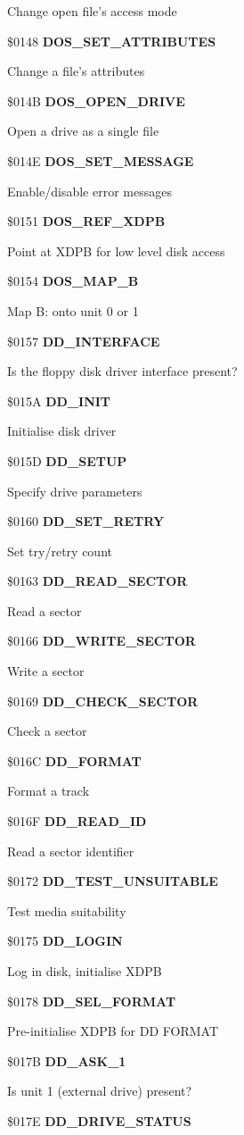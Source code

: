 Change open file's access mode

\$0148 \textbf{DOS\_SET\_ATTRIBUTES}

Change a file's attributes

\$014B \textbf{DOS\_OPEN\_DRIVE}

Open a drive as a single file

\$014E \textbf{DOS\_SET\_MESSAGE}

Enable/disable error messages

\$0151 \textbf{DOS\_REF\_XDPB}

Point at XDPB for low level disk access

\$0154 \textbf{DOS\_MAP\_B}

Map B: onto unit 0 or 1

\$0157 \textbf{DD\_INTERFACE}

Is the floppy disk driver interface present?

\$015A \textbf{DD\_INIT}

Initialise disk driver

\$015D \textbf{DD\_SETUP}

Specify drive parameters

\$0160 \textbf{DD\_SET\_RETRY}

Set try/retry count

\$0163 \textbf{DD\_READ\_SECTOR}

Read a sector

\$0166 \textbf{DD\_WRITE\_SECTOR}

Write a sector

\$0169 \textbf{DD\_CHECK\_SECTOR}

Check a sector

\$016C \textbf{DD\_FORMAT}

Format a track

\$016F \textbf{DD\_READ\_ID}

Read a sector identifier

\$0172 \textbf{DD\_TEST\_UNSUITABLE}

Test media suitability

\$0175 \textbf{DD\_LOGIN}

Log in disk, initialise XDPB

\$0178 \textbf{DD\_SEL\_FORMAT}

Pre-initialise XDPB for DD FORMAT

\$017B \textbf{DD\_ASK\_1}

Is unit 1 (external drive) present?

\$017E \textbf{DD\_DRIVE\_STATUS}

